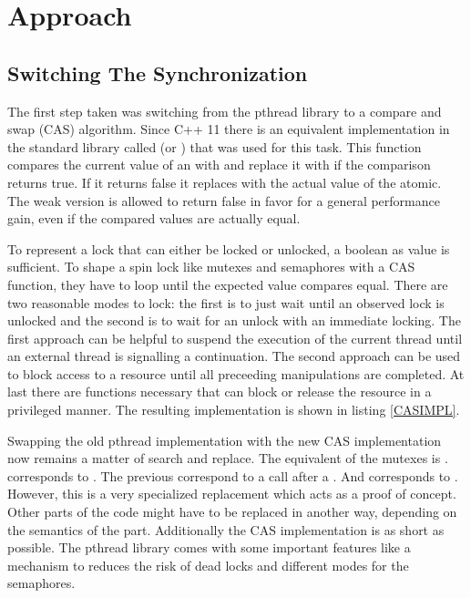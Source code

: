 

\chapter{Approach}

\section{Switching The Synchronization}
The first step taken was switching from the pthread library to a compare and swap (CAS) algorithm. Since C++ 11 there is an equivalent implementation in the standard library called  (or ) that was used for this task. This function compares the current value of an  with  and replace it with  if the comparison returns true. If it returns false it replaces  with the actual value of the atomic. The weak version is allowed to return false in favor for a general performance gain, even if the compared values are actually equal.

To represent a lock that can either be locked or unlocked, a boolean as value is sufficient. To shape a spin lock like mutexes and semaphores with a CAS function, they have to loop until the expected value compares equal. There are two reasonable modes to lock: the first is to just wait until an observed lock is unlocked and the second is to wait for an unlock with an immediate locking. The first approach can be helpful to suspend the execution of the current thread until an external thread is signalling a continuation. The second approach can be used to block access to a resource until all preceeding manipulations are completed. At last there are functions necessary that can block or release the resource in a privileged manner. The resulting implementation is shown in listing \ref{CASIMPL}.

Swapping the old pthread implementation with the new CAS implementation now remains a matter of search and replace. The equivalent of the mutexes  is .  corresponds to . The previous  correspond to a  call after a . And  corresponds to .\\
However, this is a very specialized replacement which acts as a proof of concept. Other parts of the code might have to be replaced in another way, depending on the semantics of the part. Additionally the CAS implementation is as short as possible. The pthread library comes with some important features like a mechanism to reduces the risk of dead locks and different modes for the semaphores.

